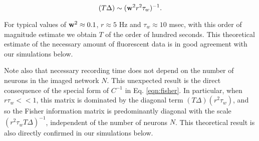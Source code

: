 \begin{equation}
(T\Delta) \sim (\bw^2 r^2  \tau_w)^{-1}.
\end{equation}

For typical values of $\mathbf{w}^2\approx 0.1$, $r\approx 5$  Hz and $ \tau_w \approx 10$ msec, 
with this order of magnitude estimate we obtain $T$ of the order of hundred seconds. This theoretical estimate of the necessary amount of fluorescent data is in good agreement with our simulations below.

Note also that necessary recording time does not depend on the number of neurons in the imaged network $N$. This unexpected result is the direct consequence of the special form of $C^{-1}$ in Eq. \eqref{eqn:fisher}. In particular, when $r \tau_w <<1$, this matrix is dominated by the diagonal term $(T\Delta)(r^2  \tau_w)$, and so the Fisher information matrix is predominantly diagonal with the scale $(r^2 \tau_w T\Delta)^{-1}$, independent of the number of neurons $N$. This theoretical result is also directly confirmed in our simulations below.